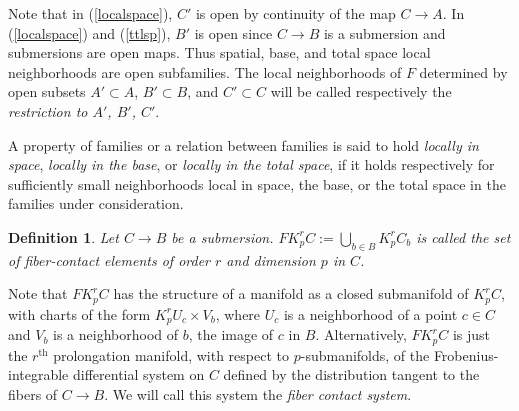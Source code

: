 \documentclass[12pt]{article}
\numberwithin{equation}{section}
\theoremstyle{plain}
\newtheorem{definition}{Definition}[section]
\newtheorem{proposition}[definition]{Proposition}
\theoremstyle{definition}
\newcommand{\M}{\mathcal{M}}
\newcommand{\FM}{\mathcal{FM}}
\newcommand{\ra}{\rightarrow}
\begin{document}
Note that in (\ref{localspace}), $C'$ is open by continuity of the map $C\ra A$. In (\ref{localspace}) and (\ref{ttlsp}), $B'$ is open since $C\ra B$ is a submersion and submersions are open maps. Thus spatial, base, and total space local neighborhoods are open subfamilies. The local neighborhoods of $F$ determined by open subsets $A'\subset A$, $B'\subset B$, and $C'\subset C$ will be called respectively the \emph{restriction to $A'$, $B'$, $C'$}.

A property of families or a relation between families is said to hold \emph{locally in space}, \emph{locally in the base}, or \emph{locally in the total space}, if it holds respectively for sufficiently small neighborhoods local in space, the base, or the total space in the families under consideration.

\begin{definition} Let $C\ra B$ be a submersion. $FK^{r}_{p}C:=\bigcup_{b\in B} K^{r}_{p}C_b$ is called the set of \emph{fiber-contact elements} of order $r$ and dimension $p$ in $C$.
\end{definition}

Note that $FK^{r}_{p}C$ has the structure of a manifold as a closed submanifold of $K^{r}_{p}C$, with charts of the form $K^{r}_{p}U_{c}\times V_{b}$, where $U_{c}$ is a neighborhood of a point $c\in C$ and $V_{b}$ is a neighborhood of $b$, the image of $c$ in $B$. Alternatively, $FK^{r}_{p}C$ is just the $r^\text{th}$ prolongation manifold, with respect to $p$-submanifolds, of the Frobenius-integrable differential system on $C$ defined by the distribution tangent to the fibers of $C\ra B$. We will call this system the \emph{fiber contact system}.



\end{document}
